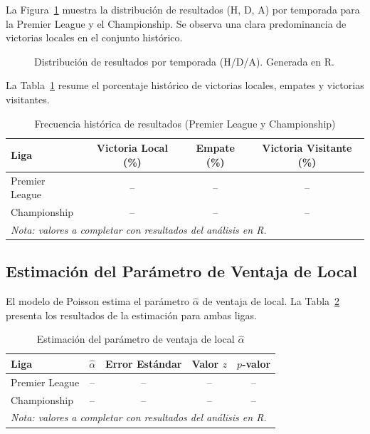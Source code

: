 \documentclass[a4paper,12pt]{article}
\begin{document}
La Figura~\ref{fig:ventaja_local} muestra la distribución de resultados (H, D, A) por temporada para la Premier League y el Championship. Se observa una clara predominancia de victorias locales en el conjunto histórico.

\begin{figure}[h!]
    \centering
    \caption{Distribución de resultados por temporada (H/D/A). Generada en R.}
    \label{fig:ventaja_local}
\end{figure}

La Tabla~\ref{tab:ventaja_descriptiva} resume el porcentaje histórico de victorias locales, empates y victorias visitantes.

\begin{table}[h!]
\centering
\caption{Frecuencia histórica de resultados (Premier League y Championship)}
\label{tab:ventaja_descriptiva}
\begin{tabular}{lccc}
\toprule
Liga & Victoria Local (\%) & Empate (\%) & Victoria Visitante (\%) \\
\midrule
Premier League & -- & -- & -- \\
Championship & -- & -- & -- \\
\midrule
\multicolumn{4}{l}{\textit{Nota: valores a completar con resultados del análisis en R.}} \\
\bottomrule
\end{tabular}
\end{table}

\subsection{Estimación del Parámetro de Ventaja de Local}

El modelo de Poisson estima el parámetro $\hat{\alpha}$ de ventaja de local. La Tabla~\ref{tab:alpha} presenta los resultados de la estimación para ambas ligas.

\begin{table}[h!]
\centering
\caption{Estimación del parámetro de ventaja de local $\hat{\alpha}$}
\label{tab:alpha}
\begin{tabular}{lcccc}
\toprule
Liga & $\hat{\alpha}$ & Error Estándar & Valor $z$ & $p$-valor \\
\midrule
Premier League & -- & -- & -- & -- \\
Championship & -- & -- & -- & -- \\
\midrule
\multicolumn{5}{l}{\textit{Nota: valores a completar con resultados del análisis en R.}} \\
\bottomrule
\end{tabular}
\end{table}
\end{document}
